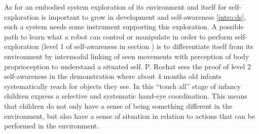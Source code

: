 \documentclass[conference]{IEEEtran}
\begin{document}
As for an embodied system exploration of its environment and itself for self-exploration is important to grow in development and self-awareness \ref{intro:ds}, such a system needs some instrument supporting this exploration. A possible path to learn what a robot can control or manipulate in order to perform self-exploration (level 1 of self-awareness in section \cite{FLSAUEL03-02}) is to differentiate itself from its environment by intermodal linking of seen movements with perception of body proprioception to understand a situated self. P. Rochat sees the proof of level 2 self-awareness in the demonstration where about 4 months old infants systematically reach for objects they see. In this ``touch all'' stage of infancy children express a selective and systematic hand-eye coordination. This means that children do not only have a sense of being something different in the environment, but also have a sense of situation in relation to actions that can be performed in the environment. 
\end{document}
